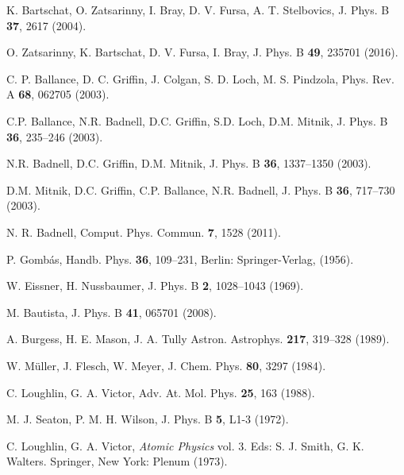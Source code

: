 \begin{thebibliography}{9}
K. Bartschat, O. Zatsarinny, I. Bray, D. V. Fursa, A. T. Stelbovics,
J. Phys. B \textbf{37}, 2617 (2004).

O. Zatsarinny, K. Bartschat, D. V. Fursa, I. Bray,
J. Phys. B \textbf{49}, 235701 (2016).

C. P. Ballance, D. C. Griffin, J. Colgan, S. D. Loch, M. S. Pindzola,
Phys. Rev. A \textbf{68}, 062705 (2003).

C.P. Ballance, N.R. Badnell, D.C. Griffin, S.D. Loch, D.M. Mitnik, 
J. Phys. B \textbf{36}, 235--246 (2003).

N.R. Badnell, D.C. Griffin, D.M. Mitnik, 
J. Phys. B \textbf{36}, 1337--1350 (2003).

D.M. Mitnik, D.C. Griffin, C.P. Ballance, N.R. Badnell, 
J. Phys. B \textbf{36}, 717--730 (2003).

N. R. Badnell, 
Comput. Phys. Commun. \textbf{7}, 1528 (2011).

P. Gombás, 
Handb. Phys. \textbf{36}, 109--231, Berlin: Springer-Verlag, (1956).

W. Eissner, H. Nussbaumer,
J. Phys. B \textbf{2}, 1028--1043 (1969).

M. Bautista,
J. Phys. B \textbf{41}, 065701 (2008).

A. Burgess, H. E. Mason, J. A. Tully
Astron. Astrophys. \textbf{217}, 319--328 (1989).

W. M\"uller, J. Flesch, W. Meyer,
J. Chem. Phys. \textbf{80}, 3297 (1984).

C. Loughlin, G. A. Victor,
Adv. At. Mol. Phys. \textbf{25}, 163 (1988).

M. J. Seaton, P. M. H. Wilson,
J. Phys. B \textbf{5}, L1-3 (1972).

C. Loughlin, G. A. Victor,
\textit{Atomic Physics} vol. 3. 
Eds: S. J. Smith, G. K. Walters.
Springer, New York: Plenum (1973).


\end{thebibliography}

